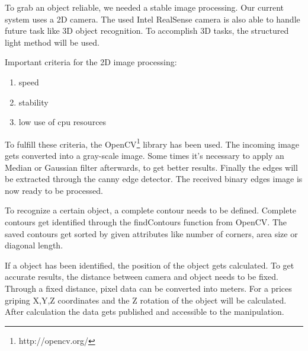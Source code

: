 To grab an object reliable, we needed a stable image processing. Our current system uses a 2D camera. The used Intel RealSense camera is also able to handle future task like 3D object recognition. To accomplish 3D tasks, the structured light method will be used.

Important criteria for the 2D image processing:

\begin{enumerate}
	\item speed
	\item stability
	\item low use of cpu resources
\end{enumerate}

To fulfill these criteria, the OpenCV\footnote{http://opencv.org/} library has been used. The incoming image gets converted into a gray-scale image. Some times it's necessary to apply an Median or Gaussian filter afterwards, to get better results. Finally the edges will be extracted through the canny edge detector. The received binary edges image is now ready to be processed.

To recognize a certain object, a complete contour needs to be defined. Complete contours get identified through the findContours function from OpenCV. The saved contours get sorted by given attributes like number of corners, area size or diagonal length.

If a object has been identified, the position of the object gets calculated. To get accurate results, the distance between camera and object needs to be fixed. Through a fixed distance, pixel data can be converted into meters. For a prices griping X,Y,Z coordinates and the Z rotation of the object will be calculated. After calculation the data gets published and accessible to the manipulation.


